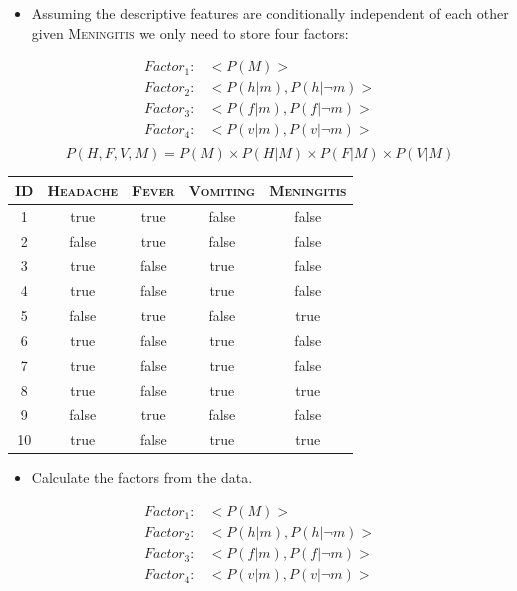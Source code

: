 \documentclass[xcolor={table}]{beamer}
\newcommand{\featN}[1]{\textsc{#1}}
\begin{document}
 \begin{frame} 
  \begin{itemize}
 	\item Assuming the descriptive features are conditionally independent of each other given \featN{Meningitis} we only need to store four factors:
\end{itemize}
\begin{equation*}
\begin{alignedat}{2}
Factor_1: & <P(M)>\\
Factor_2: & < P(h|m), P(h|\lnot m) >\\
Factor_3: & < P(f|m), P(f|\lnot m) >\\
Factor_4: & < P(v|m), P(v|\lnot m) >\\
\end{alignedat}
\end{equation*}
\begin{equation*}
P(H, F, V, M)=P(M) \times P(H|M) \times P(F|M) \times P(V|M)
\end{equation*}
\end{frame} 

\begin{frame}[plain]
\begin{table}[!tb]
\centering
\begin{footnotesize}
\begin{tabular}{ccccc}
\hline
\featN{ID} & \featN{Headache} & \featN{Fever} & \featN{Vomiting} & \featN{Meningitis}\\
\hline
1 & true & true & false & false\\
2 & false & true & false & false\\
3 & true & false & true & false\\
4 & true & false & true & false\\
5 & false & true & false & true\\
6 & true & false & true & false\\
7 & true & false & true & false\\
8 & true & false & true & true\\
9 & false & true & false & false\\
10 & true & false & true & true\\
\hline
\end{tabular}
\end{footnotesize}
\end{table}
\begin{itemize}
	\item Calculate the factors from the data.
\end{itemize}
\begin{equation*}
\begin{alignedat}{2}
Factor_1: & <P(M)>\\
Factor_2: & < P(h|m), P(h|\lnot m) >\\
Factor_3: & < P(f|m), P(f|\lnot m) >\\
Factor_4: & < P(v|m), P(v|\lnot m) >\\
\end{alignedat}
\end{equation*}
\end{frame}
\end{document}
